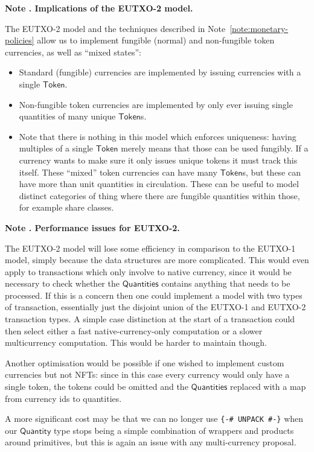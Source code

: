 \documentclass[a4paper]{article}
\newcounter{note}
\newcommand{\note}[1]{
  \bigskip
  \refstepcounter{note}
  \noindent\textbf{Note \thenote. #1}
}
\newcommand{\s}{\textsf}  %
\newcommand{\qty}{\ensuremath{\s{Quantity}}}
\newcommand{\token}{\ensuremath{\s{Token}}}
\newcommand{\qtymap}{\ensuremath{\s{Quantities}}}
\begin{document}
\note{Implications of the EUTXO-2 model.}
\label{note:eutxo-2-implications}
The EUTXO-2 model and the techniques described in
Note~\ref{note:monetary-policies} allow us to implement fungible
(normal) and non-fungible token currencies, as well as ``mixed
states'':
\begin{itemize}
\item Standard (fungible) currencies are implemented by issuing
  currencies with a single \token{}.
\item Non-fungible token currencies are implemented by only ever
  issuing single quantities of many unique \token{}s.
\item Note that there is nothing in this model which enforces
  uniqueness: having multiples of a single \token{} merely means that
  those can be used fungibly. If a currency wants to make sure it only
  issues unique tokens it must track this itself.  These ``mixed'' token
  currencies can have many \token{}s, but these can have more than unit
  quantities in circulation.  These can be useful to model distinct
  categories of thing where there are fungible quantities within
  those, for example share classes.
\end{itemize}

\note{Performance issues for EUTXO-2.}
\label{note:eutxo-2-performance}
The EUTXO-2 model will lose some efficiency in comparison to the EUTXO-1
model, simply because the data structures are more complicated.  This
would even apply to transactions which only involve to native
currency, since it would be necessary to check whether the \qtymap{}
contains anything that needs to be processed.  If this is a concern
then one could implement a model with two types of transaction,
essentially just the disjoint union of the EUTXO-1 and EUTXO-2
transaction types. A simple case distinction at the start of a
transaction could then select either a fast native-currency-only
computation or a slower multicurrency computation.  This would be
harder to maintain though.

\smallskip  Another optimisation would be possible if one wished to
implement custom currencies but not NFTs: since in this case every
currency would only have a single token, the tokens could be omitted
and the \qtymap{} replaced with a map from currency ids to quantities.

\smallskip A more significant cost may be that we can no longer use
\verb|{-# UNPACK #-}| when our \qty{} type stops being a simple
combination of wrappers and products around primitives, but this is
again an issue with any multi-currency proposal.


\end{document}
